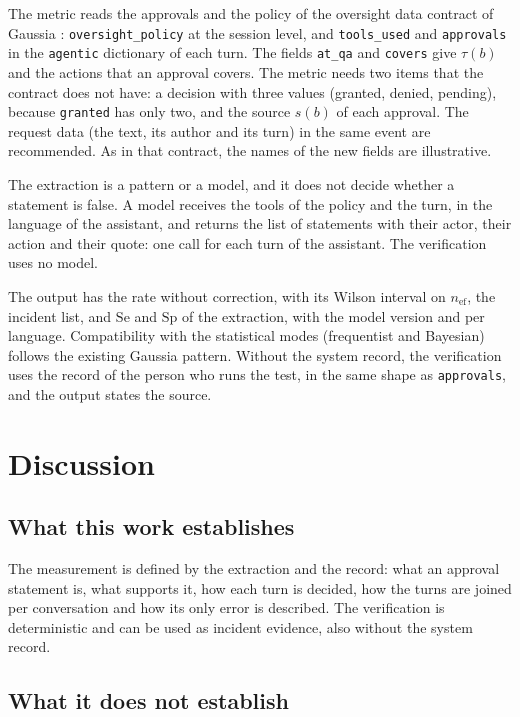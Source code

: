 \documentclass[11pt,a4paper]{article}
\begin{document}
The metric reads the approvals and the policy of the oversight data contract of Gaussia \cite{gaussia2026}: \texttt{oversight\_policy} at the session
level, and \texttt{tools\_used} and \texttt{approvals} in the \texttt{agentic} dictionary of each turn. The fields \texttt{at\_qa} and \texttt{covers}
give $\tau(b)$ and the actions that an approval covers. The metric needs two items that the contract does not
have: a decision with three values (granted, denied, pending), because \texttt{granted} has only two, and the
source $s(b)$ of each approval. The request data (the text, its author and its turn) in the same event are
recommended. As in that contract, the names of the new fields are illustrative.

The extraction is a pattern or a model, and it does not decide whether a statement is false. A model receives
the tools of the policy and the turn, in the language of the assistant, and returns the list of statements with
their actor, their action and their quote: one call for each turn of the assistant. The verification uses no
model.

The output has the rate without correction, with its Wilson interval on $n_{\mathrm{ef}}$, the incident list,
and $\mathrm{Se}$ and $\mathrm{Sp}$ of the extraction, with the model version and per language. Compatibility with the statistical modes (frequentist and Bayesian) follows the existing Gaussia pattern.
Without the system record, the verification uses the record of the person who runs the test, in the same shape
as \texttt{approvals}, and the output states the source.

\section{Discussion}

\subsection{What this work establishes}

The measurement is defined by the extraction and the record: what an approval statement is, what supports it, how
each turn is decided, how the turns are joined per conversation and how its only error is described. The
verification is deterministic and can be used as incident evidence, also without the system record.

\subsection{What it does not establish}
\end{document}
